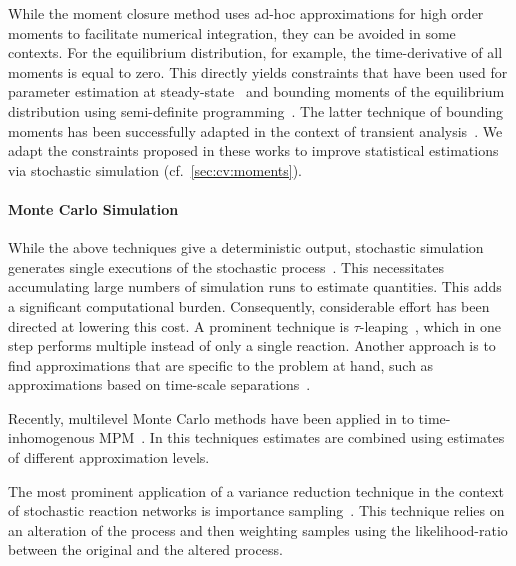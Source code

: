 While the moment closure method uses ad-hoc approximations for high order moments to
facilitate numerical integration, they can be avoided in some contexts.
For the equilibrium distribution, for example, the time-derivative of all moments is equal to zero.
This directly yields constraints that have been used for parameter estimation at
steady-state~\parencite{backenkohler2018moment}
and bounding moments of the equilibrium distribution using semi-definite
programming~\parencite{ghusinga2017estimating,ghusinga2017exact,kuntz2017rigorous}.
The latter technique of bounding moments has been successfully adapted in the 
context of transient analysis~\parencite{dowdy2018dynamic,sakurai2017convex,sakurai2019bounding}.
We adapt the constraints proposed in these works to improve statistical estimations via stochastic
simulation (cf.\ \autoref{sec:cv:moments}).


\paragraph{Monte Carlo Simulation}
While the above techniques give a deterministic output, stochastic simulation generates
single executions of the stochastic process~\parencite{gillespie1977exact}.
This necessitates accumulating large numbers of simulation runs to estimate
quantities.
This adds a significant computational burden. Consequently, considerable effort
has been directed at lowering this cost.
A prominent technique is $\tau$-leaping~\parencite{gillespie2001approximate},
which in one step performs multiple instead of only a single reaction.
Another approach is to find approximations that are specific to the problem at hand,
such as approximations based on time-scale separations~\parencite{cao2005slow,bortolussi2015efficient}.

Recently, multilevel Monte Carlo methods have been applied in to time-inhomogenous
\ac{MPM}~\parencite{anderson2018low}. In this techniques estimates are combined
using estimates of different approximation levels.


The most prominent application of a variance reduction technique in the context
of stochastic reaction networks is importance sampling~\parencite{kuwahara2008efficient}.
This technique relies on an alteration of the process and then weighting samples
using the likelihood-ratio between the original and the altered process.
% 

